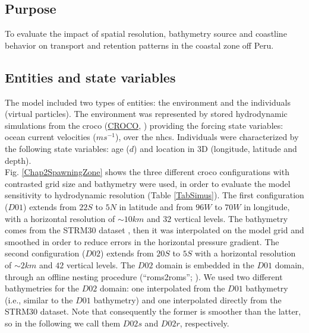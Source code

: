 \subsection{Purpose}\label{Chap2MethPurp}

To evaluate the impact of spatial resolution, bathymetry source and coastline behavior on transport and retention patterns in the coastal zone off Peru.\\

\subsection{Entities and state variables}\label{Chap2MethEnti}

The model included two types of entities: the environment and the individuals (virtual particles). The environment was represented by stored hydrodynamic simulations from the \acrlong{croco} (\href{https://www.croco-ocean.org/}{CROCO}, \cite{HiltAucl2020,ShchMcwi2005}) providing the forcing state variables: ocean current velocities ($ms^{-1}$), over the \acrshort{nhcs}. Individuals were characterized by the following state variables: age ($d$) and location in 3D (longitude, latitude and depth).\\

Fig. \ref{Chap2SpawningZone} shows the three different \acrshort{croco} configurations with contrasted grid size and bathymetry were used, in order to evaluate the model sensitivity to hydrodynamic resolution (Table \ref{TabSimus}). The first configuration ($D01$) extends from $22$\textdegree $S$ to $5$\textdegree $N$ in latitude and from $96$\textdegree $W$ to $70$\textdegree $W$ in longitude, with a horizontal resolution of $\sim 10 km$ and $32$ vertical levels. The bathymetry comes from the STRM30 dataset \citep{BeckSand2009}, then it was interpolated on the model grid and smoothed in order to reduce errors in the horizontal pressure gradient. The second configuration ($D02$) extends from $20$\textdegree $S$ to $5$\textdegree $S$ with a horizontal resolution of $\sim 2km$ and $42$ vertical levels. The $D02$ domain is embedded in the $D01$ domain, through an offline nesting procedure (``roms2roms''; \cite{MasoMole2010}). We used two different bathymetries for the $D02$ domain: one interpolated from the $D01$ bathymetry (i.e., similar to the $D01$ bathymetry) and one interpolated directly from the STRM30 dataset. Note that consequently the former is smoother than the latter, so in the following we call them $D02s$ and $D02r$, respectively.\\

